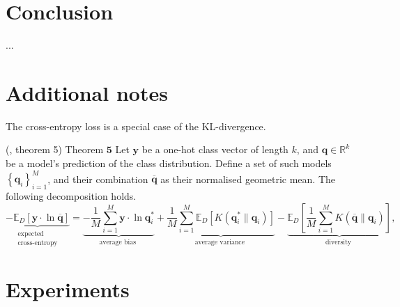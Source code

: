 \documentclass[
    a4paper, %
	fontsize=10pt, %
	twoside=false, %
]{kaobook}
\begin{document}
\begin{titlepage}





\chapter{Conclusion}
...




\appendix %


\chapter{Additional notes}

The cross-entropy loss is a special case of the KL-divergence.
\begin{lemma} (\cite{wood23}, theorem 5) \label{thm:cross-entropy-decomp}
    Theorem $\mathbf{5}$ Let $\mathbf{y}$ be a one-hot class vector of length $k$, and $\mathbf{q} \in \mathbb{R}^k$ be a model's prediction of the class distribution. Define a set of such models $\left\{\mathbf{q}_i\right\}_{i=1}^M$, and their combination $\overline{\mathbf{q}}$ as their normalised geometric mean. The following decomposition holds.
    $$
    \underbrace{-\mathbb{E}_D[\mathbf{y} \cdot \ln \overline{\mathbf{q}}]}_{\begin{array}{c}
    \text { expected } \\
    \text { cross-entropy }
    \end{array}}=\underbrace{-\frac{1}{M} \sum_{i=1}^M \mathbf{y} \cdot \ln \mathbf{q}_i^*}_{\text {average bias }}+\underbrace{\frac{1}{M} \sum_{i=1}^M \mathbb{E}_D\left[K\left(\mathbf{q}_i^* \| \mathbf{q}_i\right)\right]}_{\text {average variance }}-\underbrace{\mathbb{E}_D\left[\frac{1}{M} \sum_{i=1}^M K\left(\overline{\mathbf{q}} \| \mathbf{q}_i\right)\right]}_{\text {diversity }},
    $$
\end{lemma}


\chapter{Experiments}


\end{titlepage}
\end{document}
